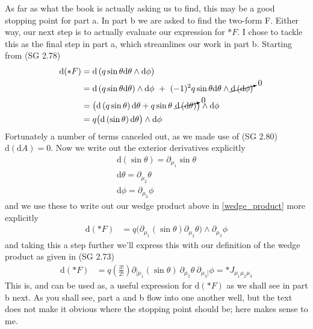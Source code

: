 As far as what the book is actually asking us to find, this may be a good stopping point for part a. In part b we are asked to find the two-form F. Either way, our next step is to actually evaluate our expression for $\ast F$. I chose to tackle this as the final step in part a, which streamlines our work in part b. Starting from (SG 2.78) 
%
\begin{align}
	\textrm{d} (\ast F) &= \textrm{d} \left( q  \sin{\theta}  \textrm{d} \theta  \wedge  \textrm{d} \phi \right) \notag \\
	 &= \textrm{d} \left( q  \sin{\theta}  \textrm{d} \theta \right)  \wedge  \textrm{d} \phi \ + \ (-1)^2 q  \sin{\theta}  \textrm{d} \theta \wedge \cancelto{0}{\textrm{d} \left(\textrm{d} \phi\right)} \notag \\
	 &= \big( \textrm{d}  \left( q  \sin{\theta} \right)  \textrm{d} \theta + q  \sin{\theta} \ \cancelto{0}{\textrm{d} \left( \textrm{d} \theta \right)} \big) \wedge  \textrm{d} \phi \notag \\
	 \label{wedge_product}&= q \big( \textrm{d} \left(\sin{\theta} \right)  \textrm{d} \theta \big) \wedge  \textrm{d} \phi
\end{align} 
%
Fortunately a number of terms canceled out, as we made use of (SG 2.80) $\textrm{d} \left( \textrm{d} A \right) = 0$. Now we write out the exterior derivatives explicitly
%
\begin{align}
\textrm{d} \left(\sin{\theta} \right) = \partial_{\mu_1} \sin{\theta} \\
\textrm{d} \theta = \partial_{\mu_2} \theta\\
\textrm{d} \phi = \partial_{\mu_3}\phi
\end{align} 
%
and we use these to write out our wedge product above in \ref{wedge_product} more explicitly
%
\begin{align}
 \textrm{d} (\ast F) &= q \big( \partial_{\mu_1} \left(\sin{\theta}\right)  \partial_{\mu_2} \theta \big) \wedge  \partial_{\mu_3}\phi
\end{align} 
%
and taking this a step further we'll express this with our definition of the wedge product as given in (SG 2.73)
%
\begin{align}
	\textrm{d} (\ast F) &= q \left( \frac{3!}{2!} \right)\partial_{[\mu_1} \left(\sin{\theta}\right) \ \partial_{\mu_2} \theta \ \partial_{\mu_3]}\phi = \ast J_{\mu_1\mu_2\mu_3} 
\end{align} 
%
This is, and can be used as, a useful expression for $\textrm{d} (\ast F)$ as we shall see in part b next. As you shall see, part a and b flow into one another well, but the text does not make it obvious where the stopping point should be; here makes sense to me. 

